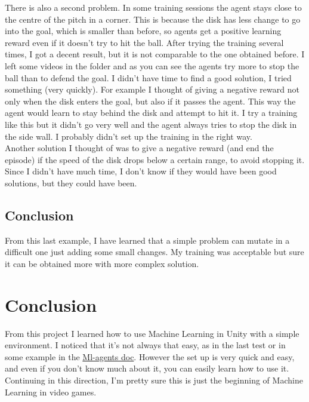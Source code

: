 \documentclass[12pt]{article}
\begin{document}
	\noindent
	There is also a second problem. In some training sessions the agent stays close to the centre of the pitch in a corner. This is because the disk has less change to go into the goal, which is smaller than before, so agents get a positive learning reward even if it doesn't try to hit the ball.
	After trying the training several times, I got a decent result, but it is not comparable to the one obtained before. I left some videos in the folder and as you can see the agents try more to stop the ball than to defend the goal.
	I didn't have time to find a good solution, I tried something (very quickly). For example I thought of giving a negative reward not only when the disk enters the goal, but also if it passes the agent. This way the agent would learn to stay behind the disk and attempt to hit it. I try a training like this but it didn't go very well and the agent always tries to stop the disk in the side wall. I probably didn't set up the training in the right way.\\
	Another solution I thought of was to give a negative reward (and end the episode) if the speed of the disk drops below a certain range, to avoid stopping it.\\
	Since I didn't have much time, I don't know if they would have been good solutions, but they could have been.
	
	\subsection{Conclusion}
	From this last example, I have learned that a simple problem can mutate in a difficult one just adding some small changes. My training was acceptable but sure it can be obtained more with more complex solution.
	
	\newpage
	
	\section{Conclusion}
	From this project I learned how to use Machine Learning in Unity with a simple environment. I noticed that it's not always that easy, as in the last test or in some example in the  \href{https://github.com/Unity-Technologies/ml-agents/blob/master/docs/Learning-Environment-Examples.md}{Ml-agents doc}. However the set up is very quick and easy, and even if you don't know much about it, you can easily learn how to use it. Continuing in this direction, I'm pretty sure this is just the beginning of Machine Learning in video games.
\end{document}
